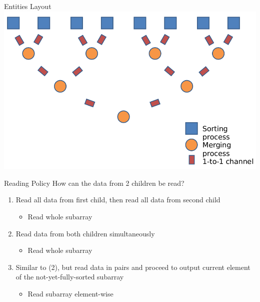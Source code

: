 \begin{frame}{Entities Layout}
  \includegraphics[width=\textwidth]{figures/mergesort}
\end{frame}

\begin{frame}{Reading Policy}
  How can the data from 2 children be read?


  \begin{enumerate}
  \item Read all data from first child, then read all data from second
    child
   \begin{itemize}
   \item Read whole subarray
   \end{itemize}
 \item Read data from both children simultaneously
   \begin{itemize}
   \item Read whole subarray
   \end{itemize}
 \item Similar to (2), but read data in pairs and proceed to output
   current element of the not-yet-fully-sorted subarray
   \begin{itemize}
   \item Read subarray element-wise
   \end{itemize}

  \end{enumerate}
\end{frame}

